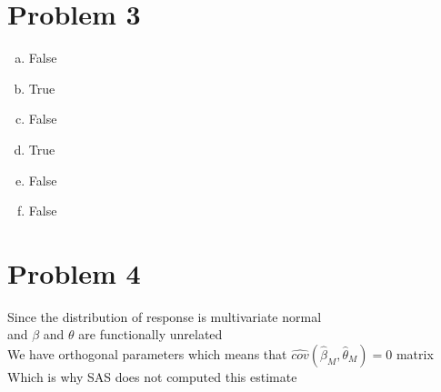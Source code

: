 \documentclass{article}
\newcommand{\hb}{\hat{\beta}}
\newcommand{\hth}{\hat{\theta}}
\begin{document}
\begin{flushleft}
\section*{Problem 3}
\begin{enumerate}[(a)]
\item False
\item True
\item False
\item True
\item False
\item False
\end{enumerate}
\section*{Problem 4}
Since the distribution of response is multivariate normal\\
and $\beta$ and $\theta$ are functionally unrelated\\
We have orthogonal parameters which means that $\hat{cov}(\hb_M,\hth_M)=0$ matrix\\
Which is why SAS does not computed this estimate

\end{flushleft}
\end{document}
